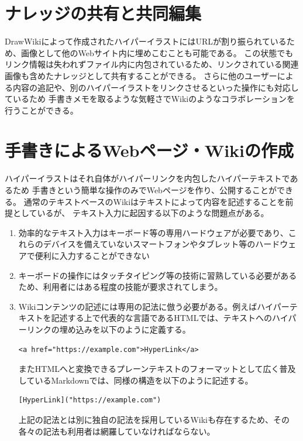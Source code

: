 \section{ナレッジの共有と共同編集}
DrawWikiによって作成されたハイパーイラストにはURLが割り振られているため、画像として他のWebサイト内に埋めこむことも可能である。
この状態でもリンク情報は失われずファイル内に内包されているため、リンクされている関連画像も含めたナレッジとして共有することができる。
さらに他のユーザーによる内容の追記や、別のハイパーイラストをリンクさせるといった操作にも対応しているため
手書きメモを取るような気軽さでWikiのようなコラボレーションを行うことができる。


\section{手書きによるWebページ・Wikiの作成}
\label{tegakiwiki}
ハイパーイラストはそれ自体がハイパーリンクを内包したハイパーテキストであるため
手書きという簡単な操作のみでWebページを作り、公開することができる。
通常のテキストベースのWikiはテキストによって内容を記述することを前提としているが、
テキスト入力に起因する以下のような問題点がある。
\begin{enumerate}
    \item 効率的なテキスト入力はキーボード等の専用ハードウェアが必要であり、これらのデバイスを備えていないスマートフォンやタブレット等のハードウェアで便利に入力することができない
    \item キーボードの操作にはタッチタイピング等の技術に習熟している必要があるため、利用者にはある程度の技能が要求されてしまう。
    \item Wikiコンテンツの記述には専用の記法に倣う必要がある。例えばハイパーテキストを記述する上で代表的な言語であるHTMLでは、テキストへのハイパーリンクの埋め込みを以下のように定義する。
    \begin{lstlisting}[caption=htmlにおけるハイパーリンクの定義, label=htmlhyperlinking]
        <a href="https://example.com">HyperLink</a>
    \end{lstlisting}
    またHTMLへと変換できるプレーンテキストのフォーマットとして広く普及しているMarkdownでは、同様の構造を以下のように記述する。
    \begin{lstlisting}[caption=htmlにおけるハイパーリンクの定義, label=mdhyperlinking]
        [HyperLink]("https://example.com")
    \end{lstlisting}
    上記の記法とは別に独自の記法を採用しているWikiも存在するため、その各々の記法も利用者は網羅していなければならない。
\end{enumerate}

